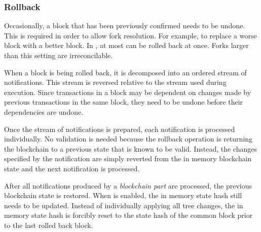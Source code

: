 \subsubsection*{Rollback}

Occasionally, a block that has been previously confirmed needs to be undone.
This is required in order to allow fork resolution.
For example, to replace a worse block with a better block.
In \codename, at most  can be rolled back at once.
Forks larger than this setting are irreconcilable.

When a block is being rolled back, it is decomposed into an ordered stream of notifications.
This stream is reversed relative to the stream used during execution.
Since transactions in a block may be dependent on changes made by previous transactions in the same block, they need to be undone before their dependencies are undone.

Once the stream of notifications is prepared, each notification is processed individually.
No validation is needed because the rollback operation is returning the blockchain to a previous state that is known to be valid.
Instead, the changes specified by the notification are simply reverted from the in memory blockchain state and the next notification is processed.

After all notifications produced by a \emph{blockchain part} are processed, the previous blockchain state is restored.
When  is enabled, the in memory state hash still needs to be updated.
Instead of individually applying all tree changes, the in memory state hash is forcibly reset to the state hash of the common block prior to the last rolled back block.
